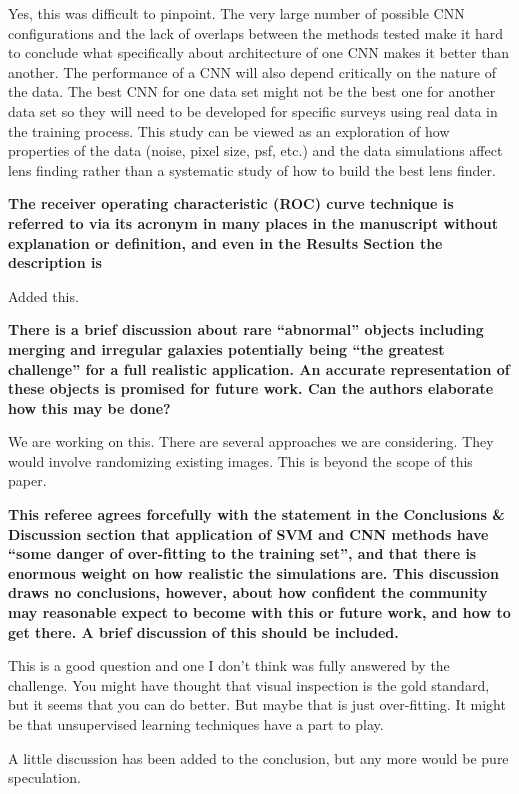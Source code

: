 \documentclass[11pt,a4paper]{article}
\begin{document}
Yes, this was difficult to pinpoint.  The very large number of possible CNN configurations and the lack of overlaps between the methods tested make it hard to conclude what specifically about architecture of one CNN makes it better than another.   The performance of a CNN will also depend critically on the nature of the data.  The best CNN for one data set might not be the best one for another data set so they will need to be developed for specific surveys using real data in the training process.  This study can be 
viewed as an exploration of how properties of the data (noise, pixel size, psf, etc.) and the data simulations affect lens finding rather than a systematic study of how to build the best lens finder.

{\bf
The receiver operating characteristic (ROC) curve technique is referred to via its acronym in many places in the manuscript without explanation or definition, and even in the Results Section the description is 
}

Added this.

{\bf
There is a brief discussion about rare “abnormal” objects including merging and irregular galaxies potentially being “the greatest challenge” for a full realistic application. 
An accurate representation of these objects is promised for future work. Can the authors elaborate how this may be done? 
}

We are working on this.  There are several approaches we are considering.  They would 
involve randomizing existing images.  This is beyond the scope of this paper.

{\bf
This referee agrees forcefully with the statement in the Conclusions \& Discussion section that application of SVM and CNN methods have “some danger of over-fitting to the training set”, and that there is enormous weight on how realistic the simulations are.  This discussion draws no conclusions, however, about how confident the community may reasonable expect to become with this or future work, and how to get there.  A brief discussion of this should be included.  
}

This is a good question and one I don't think was fully answered by the challenge.  You might have 
thought that visual inspection is the gold standard, but it seems that you can do better.  But maybe 
that is just over-fitting.  It might be that unsupervised learning techniques have a part to play.  

A little discussion has been added to the conclusion, but any more would be pure speculation.
\end{document}
